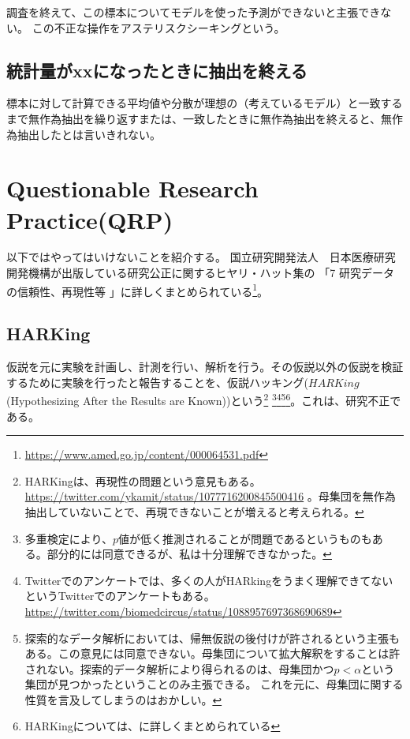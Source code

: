 調査を終えて、この標本についてモデルを使った予測ができないと主張できない。
この不正な操作をアステリスクシーキングという。


\subsection{統計量がxxになったときに抽出を終える}
標本に対して計算できる平均値や分散が理想の（考えているモデル）と一致するまで無作為抽出を繰り返すまたは、一致したときに無作為抽出を終えると、無作為抽出したとは言いきれない。



\section{Questionable Research Practice(QRP)}
以下ではやってはいけないことを紹介する。
国立研究開発法人　日本医療研究開発機構が出版している研究公正に関するヒヤリ・ハット集の
「7 研究データの信頼性、再現性等 」に詳しくまとめられている\footnote{\url{https://www.amed.go.jp/content/000064531.pdf}}。
\subsection{HARKing}
仮説を元に実験を計画し、計測を行い、解析を行う。その仮説以外の仮説を検証するために実験を行ったと報告することを、仮説ハッキング($HARKing$(Hypothesizing After the Results are Known))という\footnote{
    HARKingは、再現性の問題という意見もある。
    \url{https://twitter.com/ykamit/status/1077716200845500416} 。母集団を無作為抽出していないことで、再現できないことが増えると考えられる。
}
\footnote{
    多重検定により、$p$値が低く推測されることが問題であるというものもある\cite{池田_功毅2016,中村_大輝2021sp20016}。部分的には同意できるが、私は十分理解できなかった。
}\footnote{
    Twitterでのアンケートでは、多くの人がHARkingをうまく理解できてないというTwitterでのアンケートもある。
    \url{https://twitter.com/biomedcircus/status/1088957697368690689}
}\footnote{
    探索的なデータ解析においては、帰無仮説の後付けが許されるという主張もある。この意見には同意できない。母集団について拡大解釈をすることは許されない。探索的データ解析により得られるのは、母集団かつ$p<\alpha$という集団が見つかったということのみ主張できる。
    これを元に、母集団に関する性質を言及してしまうのはおかしい。
}\footnote{
    HARKingについては、\cite{kerr1998harking}に詳しくまとめられている
}。これは、研究不正である。


